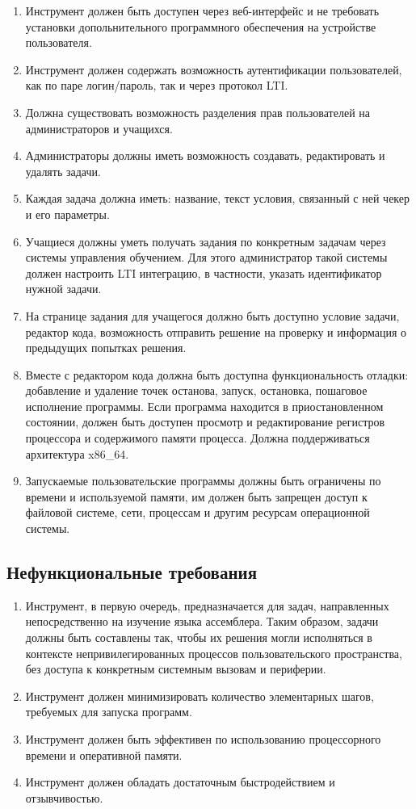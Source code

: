 \documentclass[a4paper,article,14pt]{extarticle}
\begin{document}
\begin{enumerate}
    \item Инструмент должен быть доступен через веб-интерфейс и не требовать установки допольнительного программного обеспечения на устройстве пользователя.
    \item Инструмент должен содержать возможность аутентификации пользователей, как по паре логин/пароль, так и через протокол LTI.
    \item Должна существовать возможность разделения прав пользователей на администраторов и учащихся.
    \item Администраторы должны иметь возможность создавать, редактировать и удалять задачи.
    \item Каждая задача должна иметь: название, текст условия, связанный с ней чекер и его параметры.
    \item Учащиеся должны уметь получать задания по конкретным задачам через системы управления обучением. Для этого администратор такой системы должен настроить LTI интеграцию, в частности, указать идентификатор нужной задачи.
    \item На странице задания для учащегося должно быть доступно условие задачи, редактор кода, возможность отправить решение на проверку и информация о предыдущих попытках решения.
    \item Вместе с редактором кода должна быть доступна функциональность отладки: добавление и удаление точек останова, запуск, остановка, пошаговое исполнение программы. Если программа находится в приостановленном состоянии, должен быть доступен просмотр и редактирование регистров процессора и содержимого памяти процесса. Должна поддерживаться архитектура x86\_64.
    \item Запускаемые пользовательские программы должны быть ограничены по времени и используемой памяти, им должен быть запрещен доступ к файловой системе, сети, процессам и другим ресурсам операционной системы.
\end{enumerate}

\subsection{Нефункциональные требования}

\begin{enumerate}
    \item Инструмент, в первую очередь, предназначается для задач, направленных непосредственно на изучение языка ассемблера. Таким образом, задачи должны быть составлены так, чтобы их решения могли исполняться в контексте непривилегированных процессов пользовательского пространства, без доступа к конкретным системным вызовам и периферии.
    \item Инструмент должен минимизировать количество элементарных шагов, требуемых для запуска программ.
    \item Инструмент должен быть эффективен по использованию процессорного времени и оперативной памяти.
    \item Инструмент должен обладать достаточным быстродействием и отзывчивостью.
\end{enumerate}
\end{document}
